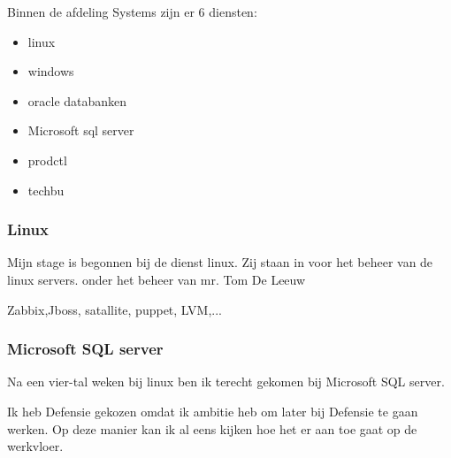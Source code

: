 Binnen de afdeling Systems zijn er 6 diensten:

\begin{itemize}
    \item linux
    \item windows
    \item oracle databanken
    \item Microsoft sql server
    \item prodctl
    \item techbu
\end{itemize}

\subsubsection{Linux}

Mijn stage is begonnen bij de dienst linux. Zij staan in voor het beheer van de linux servers. onder het beheer van mr. Tom De Leeuw

Zabbix,Jboss, satallite, puppet, LVM,...

\subsubsection{Microsoft SQL server}

Na een vier-tal weken bij linux ben ik terecht gekomen bij Microsoft SQL server. 

Ik heb Defensie gekozen omdat ik ambitie heb om later bij Defensie te gaan werken. Op deze manier kan ik al eens kijken hoe het er aan toe gaat op de werkvloer.